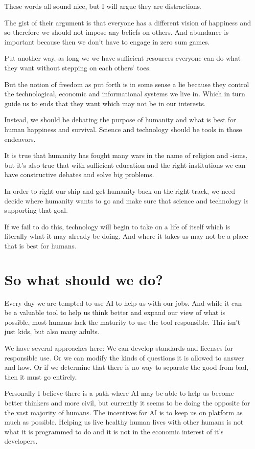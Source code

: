 \documentclass[11pt]{article}
\begin{document}
These words all sound nice, but I will argue they are distractions.

The gist of their argument is that everyone has a different vision of happiness and so therefore we should not impose any beliefs on others. And abundance is important because then we don't have to engage in zero sum games.

Put another way, as long we we have sufficient resources everyone can do what they want without stepping on each others' toes.

But the notion of freedom as put forth is in some sense a lie because they control the technological, economic and informational systems we live in. Which in turn guide us to ends that they want which may not be in our interests.

Instead, we should be debating the purpose of humanity and what is best for human happiness and survival. Science and technology should be tools in those endeavors.

It is true that humanity has fought many wars in the name of religion and -isms, but it's also true that with sufficient education and the right institutions we can have constructive debates and solve big problems. 

In order to right our ship and get humanity back on the right track, we need decide where humanity wants to go and make sure that science and technology is supporting that goal.

If we fail to do this, technology will begin to take on a life of itself which is literally what it may already be doing. And where it takes us may not be a place that is best for humans. 
\section{So what should we do?}
\label{sec:org8b36769}

Every day we are tempted to use AI to help us with our jobs. And while it can be a valuable tool to help us think better and expand our view of what is possible, most humans lack the maturity to use the tool responsible. This isn't just kids, but also many adults.

We have several approaches here: We can develop standards and licenses for responsible use. Or we can modify the kinds of questions it is allowed to answer and how. Or if we determine that there is no way to separate the good from bad, then it must go entirely.

Personally I believe there is a path where AI may be able to help us become better thinkers and more civil, but currently it seems to be doing the opposite for the vast majority of humans. The incentives for AI is to keep us on platform as much as possible. Helping us live healthy human lives with other humans is not what it is programmed to do and it is not in the economic interest of it's developers.  
\end{document}
